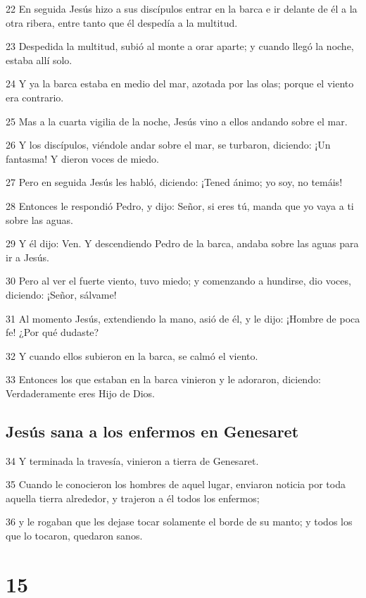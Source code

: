 \par 22 En seguida Jesús hizo a sus discípulos entrar en la barca e ir delante de él a la otra ribera, entre tanto que él despedía a la multitud.
\par 23 Despedida la multitud, subió al monte a orar aparte; y cuando llegó la noche, estaba allí solo.
\par 24 Y ya la barca estaba en medio del mar, azotada por las olas; porque el viento era contrario.
\par 25 Mas a la cuarta vigilia de la noche, Jesús vino a ellos andando sobre el mar.
\par 26 Y los discípulos, viéndole andar sobre el mar, se turbaron, diciendo: ¡Un fantasma! Y dieron voces de miedo.
\par 27 Pero en seguida Jesús les habló, diciendo: ¡Tened ánimo; yo soy, no temáis!
\par 28 Entonces le respondió Pedro, y dijo: Señor, si eres tú, manda que yo vaya a ti sobre las aguas.
\par 29 Y él dijo: Ven. Y descendiendo Pedro de la barca, andaba sobre las aguas para ir a Jesús.
\par 30 Pero al ver el fuerte viento, tuvo miedo; y comenzando a hundirse, dio voces, diciendo: ¡Señor, sálvame!
\par 31 Al momento Jesús, extendiendo la mano, asió de él, y le dijo: ¡Hombre de poca fe! ¿Por qué dudaste?
\par 32 Y cuando ellos subieron en la barca, se calmó el viento.
\par 33 Entonces los que estaban en la barca vinieron y le adoraron, diciendo: Verdaderamente eres Hijo de Dios.

\section*{Jesús sana a los enfermos en Genesaret}

\par 34 Y terminada la travesía, vinieron a tierra de Genesaret.
\par 35 Cuando le conocieron los hombres de aquel lugar, enviaron noticia por toda aquella tierra alrededor, y trajeron a él todos los enfermos;
\par 36 y le rogaban que les dejase tocar solamente el borde de su manto; y todos los que lo tocaron, quedaron sanos.

\chapter{15}


